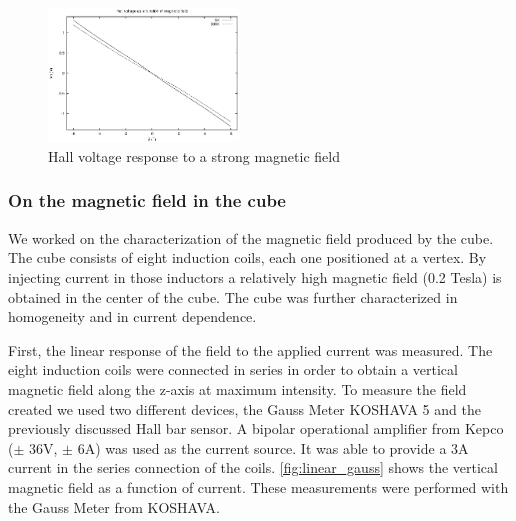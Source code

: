 \documentclass[journal]{IEEEtran}
\begin{document}
\begin{figure}[h]
\centering
\includegraphics[width=0.45\textwidth]{tension_hall_fonction_champ_6T.eps}
\caption{Hall voltage response to a strong magnetic field}
\label{fig:hall_champ_6}
\end{figure}






\subsubsection{On the magnetic field in the cube}

We worked on the characterization of the magnetic field produced by the cube. The cube consists of eight induction coils, each one positioned at a vertex. By injecting current in those inductors a relatively high magnetic field (0.2 Tesla) is obtained in the center of the cube. The cube was further characterized in homogeneity and in current dependence.



First, the linear response of the field to the applied current was measured. The eight induction coils were connected in series in order to obtain a vertical magnetic field along the z-axis at maximum intensity. To measure the field created we used two different devices, the Gauss Meter KOSHAVA 5 and the previously discussed Hall bar sensor. A bipolar operational amplifier from Kepco ($\pm$ 36V, $\pm$ 6A) was used as the current source. It was able to provide a 3A current in the series connection of the coils. \figurename \ref{fig:linear_gauss} shows the vertical magnetic field as a function of current. These measurements were performed with the Gauss Meter from KOSHAVA.
\end{document}
